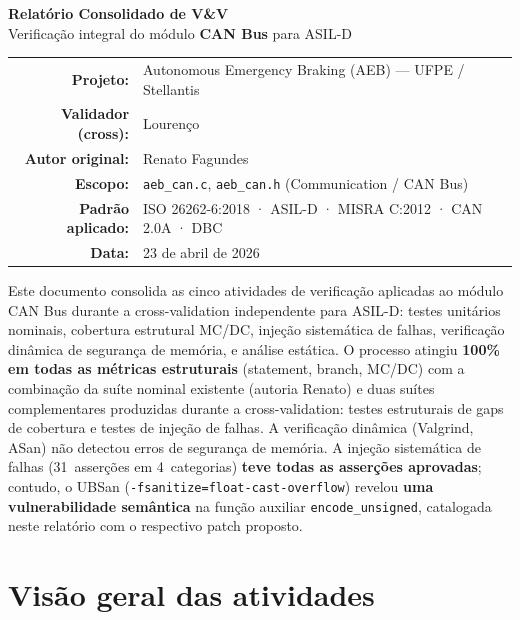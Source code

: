 \documentclass[12pt]{article}
\begin{document}
\begin{center}
{\LARGE\bfseries\color{stellantis} Relatório Consolidado de V\&V}\\[6pt]
{\large Verificação integral do módulo \textbf{CAN Bus} para ASIL-D}\\[10pt]
{\small
\begin{tabular}{rl}
\textbf{Projeto:}           & Autonomous Emergency Braking (AEB) --- UFPE / Stellantis \\
\textbf{Validador (cross):} & Lourenço \\
\textbf{Autor original:}    & Renato Fagundes \\
\textbf{Escopo:}            & \texttt{aeb\_can.c}, \texttt{aeb\_can.h} (Communication / CAN Bus) \\
\textbf{Padrão aplicado:}   & ISO 26262-6:2018 · ASIL-D · MISRA C:2012 · CAN 2.0A · DBC \\
\textbf{Data:}              & 23 de abril de 2026 \\
\end{tabular}
}
\end{center}

\vspace{0.3cm}

\begin{tcolorbox}[colback=ddbrownlight, colframe=ddbrown, title=\textbf{Sumário executivo}]
Este documento consolida as cinco atividades de verificação aplicadas ao módulo CAN Bus durante a
cross-validation independente para ASIL-D: testes unitários nominais, cobertura estrutural MC/DC, injeção
sistemática de falhas, verificação dinâmica de segurança de memória, e análise estática. O processo
atingiu \textbf{100\% em todas as métricas estruturais} (statement, branch, MC/DC) com a combinação da
suíte nominal existente (autoria Renato) e duas suítes complementares produzidas durante a
cross-validation: testes estruturais de gaps de cobertura e testes de injeção de falhas. A verificação
dinâmica (Valgrind, ASan) não detectou erros de segurança de memória. A injeção sistemática de falhas
(31~asserções em 4~categorias) \textbf{teve todas as asserções aprovadas}; contudo, o UBSan
(\texttt{-fsanitize=float-cast-overflow}) revelou \textbf{uma vulnerabilidade semântica} na função
auxiliar \texttt{encode\_unsigned}, catalogada neste relatório com o respectivo patch proposto.
\end{tcolorbox}

\section{Visão geral das atividades}
\end{document}
